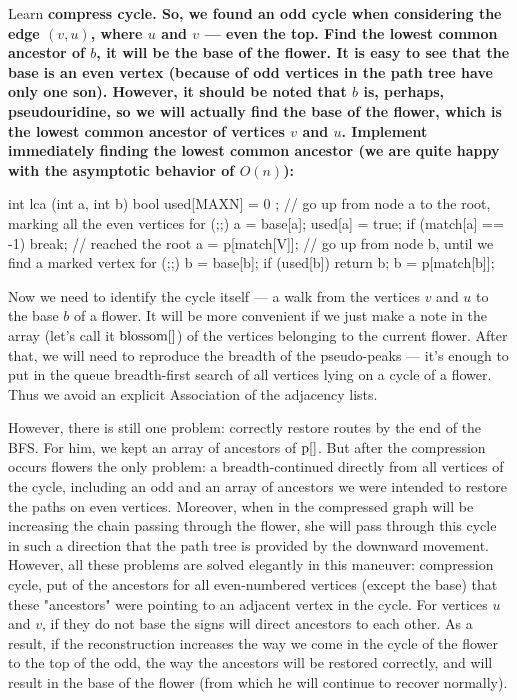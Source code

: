 Learn \bf{compress cycle}. So, we found an odd cycle when considering the edge $(v,u)$, where $u$ and $v$ --- even the top. Find the lowest common ancestor of $b$, it will be the base of the flower. It is easy to see that the base is an even vertex (because of odd vertices in the path tree have only one son). However, it should be noted that $b$ is, perhaps, pseudouridine, so we will actually find the base of the flower, which is the lowest common ancestor of vertices $v$ and $u$. Implement immediately finding the lowest common ancestor (we are quite happy with the asymptotic behavior of $O(n)$):

\code
int lca (int a, int b) {
bool used[MAXN] = { 0 };
// go up from node a to the root, marking all the even vertices
for (;;) {
a = base[a];
used[a] = true;
if (match[a] == -1) break; // reached the root
a = p[match[V]];
}
// go up from node b, until we find a marked vertex
for (;;) {
b = base[b];
if (used[b]) return b;
b = p[match[b]];
}
}
\endcode

Now we need to identify the cycle itself --- a walk from the vertices $v$ and $u$ to the base $b$ of a flower. It will be more convenient if we just make a note in the array (let's call it $\rm blossom[]$) of the vertices belonging to the current flower. After that, we will need to reproduce the breadth of the pseudo-peaks --- it's enough to put in the queue breadth-first search of all vertices lying on a cycle of a flower. Thus we avoid an explicit Association of the adjacency lists.

However, there is still one problem: correctly restore routes by the end of the BFS. For him, we kept an array of ancestors of $\rm p[]$. But after the compression occurs flowers the only problem: a breadth-continued directly from all vertices of the cycle, including an odd and an array of ancestors we were intended to restore the paths on even vertices. Moreover, when in the compressed graph will be increasing the chain passing through the flower, she will pass through this cycle in such a direction that the path tree is provided by the downward movement. However, all these problems are solved elegantly in this maneuver: compression cycle, put of the ancestors for all even-numbered vertices (except the base) that these "ancestors" were pointing to an adjacent vertex in the cycle. For vertices $u$ and $v$, if they do not base the signs will direct ancestors to each other. As a result, if the reconstruction increases the way we come in the cycle of the flower to the top of the odd, the way the ancestors will be restored correctly, and will result in the base of the flower (from which he will continue to recover normally).

